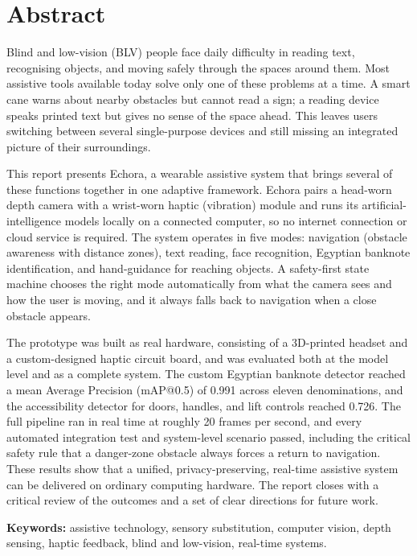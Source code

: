 \chapter*{Abstract}

Blind and low-vision (BLV) people face daily difficulty in reading text, recognising objects, and moving safely through the spaces around them. Most assistive tools available today solve only one of these problems at a time. A smart cane warns about nearby obstacles but cannot read a sign; a reading device speaks printed text but gives no sense of the space ahead. This leaves users switching between several single-purpose devices and still missing an integrated picture of their surroundings.

This report presents Echora, a wearable assistive system that brings several of these functions together in one adaptive framework. Echora pairs a head-worn depth camera with a wrist-worn haptic (vibration) module and runs its artificial-intelligence models locally on a connected computer, so no internet connection or cloud service is required. The system operates in five modes: navigation (obstacle awareness with distance zones), text reading, face recognition, Egyptian banknote identification, and hand-guidance for reaching objects. A safety-first state machine chooses the right mode automatically from what the camera sees and how the user is moving, and it always falls back to navigation when a close obstacle appears.

The prototype was built as real hardware, consisting of a 3D-printed headset and a custom-designed haptic circuit board, and was evaluated both at the model level and as a complete system. The custom Egyptian banknote detector reached a mean Average Precision (mAP@0.5) of 0.991 across eleven denominations, and the accessibility detector for doors, handles, and lift controls reached 0.726. The full pipeline ran in real time at roughly 20 frames per second, and every automated integration test and system-level scenario passed, including the critical safety rule that a danger-zone obstacle always forces a return to navigation. These results show that a unified, privacy-preserving, real-time assistive system can be delivered on ordinary computing hardware. The report closes with a critical review of the outcomes and a set of clear directions for future work.

\vspace{0.8cm}
\noindent\textbf{Keywords:} assistive technology, sensory substitution, computer vision, depth sensing, haptic feedback, blind and low-vision, real-time systems.

\clearpage
